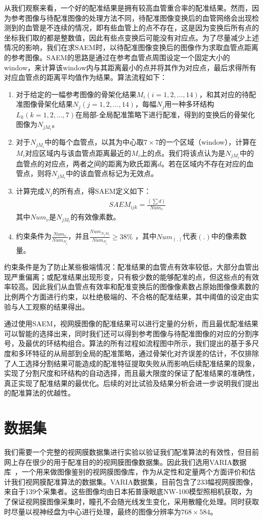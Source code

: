 从我们观察来看，一个好的配准结果是拥有较高血管重合率的配准结果。然而，因为参考图像与待配准图像的处理方法不同，待配准图像变换后的血管网络会出现检测到的血管是不连续的情况，即有些血管上的点不存在，这是因为变换后所有点的坐标我们取的都是整数值，因此有些点变换后可能没有对应点。为了尽量减少上述情况的影响，我们在求SAEM时，以待配准图像变换后的图像作为求取血管点距离的参考图像。SAEM的思路是通过在参考血管点周围设定一个固定大小的window，来计算该window内与其距离最小的点并将其作为对应点，最后求得所有对应血管点的距离平均值作为结果。算法流程如下：
\begin{enumerate}
\item 对于给定的一幅参考图像的骨架化结果$M_i(i=1,2,\ldots,14)$，和其对应的待配准图像骨架化结果$N_j(j=1,2,\ldots,14)$，每幅$N_j$用一种多环结构$L_k(k=1,2,\ldots,7)$在局部-全局配准策略下进行配准，得到的变换后的骨架化图像为$N_{jM_i}$。
\item 对于$N_{jM_i}$中的每个血管点，以其为中心取$7\times7$的一个区域（window），计算在$M_i$对应区域内与该血管点距离最近的$M_i$上的点。我们将该点认为是$N_{jM_i}$中的血管点的对应点，两者之间的距离为欧氏距离$d$。若在区域内不存在对应的血管点，则将$N_{jM_i}$中的该血管点标记为无效点。
\item 计算完成$N_j$的所有点，得SAEM定义如下：
\begin{align}
SAEM_{ijk}=\frac{(\sum d)}{Num_v}
\end{align}	 	
其中$Num_v$是$N_{jM_i}$的有效像素数。
\item 约束条件为$\frac{Num_v}{Num_{N_j}}$，并且$\frac{Num_{N_jM_i}}{Num_{N_j}}\geq 38\%$ ，其中$Num_{(.)}$代表$(.)$中的像素数量。
\end{enumerate}

约束条件是为了防止某些极端情况：配准结果的血管点有效率较低，大部分血管出现严重偏离；或配准结果出现形变，只有极少数的能够配准的点，但这些点的有效率较高。因此我们从血管点有效率和配准变换后的图像像素数占原始图像像素数的比例两个方面进行约束，以杜绝极端的、不合格的配准结果，其中阈值的设定由实验与人工观察的结果得出。

通过使用SAEM，视网膜图像的配准结果可以进行定量的分析，而且最优配准结果可以智能的选择出来，同时我们还可以得到参考图像与待配准图像的对应的分割序号，及最优的环结构组合。算法的所有过程如流程图中所示，我们提出的基于多尺度和多环特征的从局部到全局的配准策略，通过骨架化对齐误差的估计，不仅排除了人工选择分割结果可能造成的配准特征提取失败从而影响后续配准结果的现象，实现了分割尺度和环结构的自动选择，而且最大限度的保证了配准结果的准确性，真正实现了配准结果的最优化。后续的对比试验及结果分析会进一步说明我们提出的配准算法的优越性。
\section{数据集}
我们需要一个完整的视网膜数据集进行实验以验证我们配准算法的有效性，但目前网上存在很少的用于配准目的的视网膜图像数据集。因此我们选用VARIA数据库~\cite{ortega}\cite{ortega1}，一个用来做图像鉴别的视网膜图像库，作为从定性和定量两个方面评价和估计我们视网膜配准算法的数据集。VARIA数据集，目前包含了233幅视网膜图像，来自于139个采集者。这些图像均由日本拓普康眼底NW-100模型照相机获取，为了保证视网膜图像采集时，瞳孔不会随光线发生变化，采用散瞳化处理。同时获取时尽量以视神经盘为中心进行处理，最终的图像分辨率为$768\times584$。

